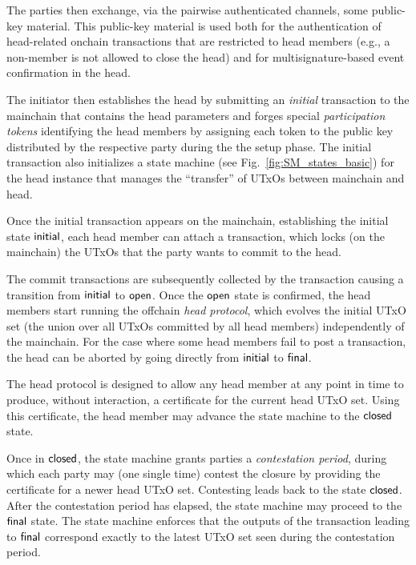 The parties then exchange, via the pairwise authenticated channels,
some public-key material. This public-key material is used both
for the authentication of head-related onchain transactions that
are restricted to head members (e.g., a non-member is not allowed
to close the head) and for multisignature-based event confirmation
in the head.

The initiator then establishes the head by submitting an
\emph{initial} transaction to the mainchain that contains the
head parameters and forges special \emph{participation tokens}
identifying the head members by assigning each token to the public key
distributed by the respective party during the the setup phase.
The initial transaction also initializes a state machine
(see Fig.~\ref{fig:SM_states_basic}) for the head instance that manages
the ``transfer'' of UTxOs between mainchain and head.

Once the initial transaction appears on the mainchain, establishing
the initial state $\mathsf{initial}$, each head member can attach a
\mtxCom{} transaction, which locks (on the mainchain) the UTxOs that
the party wants to commit to the head.

The commit transactions are subsequently collected by the \mtxCCom{}
transaction causing a transition from $\mathsf{initial}$ to $\mathsf{open}$.  Once
the $\mathsf{open}$ state is confirmed, the head members start running the
offchain \emph{head protocol}, which evolves the initial UTxO set (the
union over all UTxOs committed by all head members) independently of
the mainchain.  For the case where some head members fail to post a
\mtxCom{} transaction, the head can be aborted by going directly from
$\mathsf{initial}$ to $\mathsf{final}$.

The head protocol is designed to allow any head member
at any point in time to produce, without interaction, a certificate
for the current head UTxO set.  Using this certificate, the head member
may advance the state machine to the $\mathsf{closed}$ state.

Once in $\mathsf{closed}$, the state machine grants parties a
\emph{contestation period}, during which each party may (one single
time) contest the closure by providing the certificate for a newer head
UTxO set.  Contesting leads back to the state $\mathsf{closed}$.
After the contestation period has elapsed, the state machine may proceed
to the $\mathsf{final}$ state.  The state machine enforces that the
outputs of the transaction leading to $\mathsf{final}$ correspond exactly to
the latest UTxO set seen during the contestation period.


